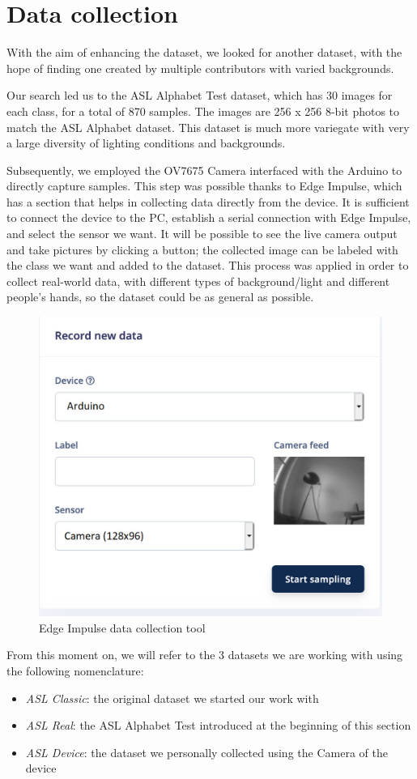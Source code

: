 \documentclass{Configuration_Files/PoliMi3i_thesis}
\begin{document}
\chapter{Data collection}
\label{ch:data-coll}%
With the aim of enhancing the dataset, we looked for another dataset, with the hope of finding one created by multiple contributors with varied backgrounds.

Our search led us to the ASL Alphabet Test \cite{asl_test} dataset, which has 30 images for each class, for a total of 870 samples. The images are 256 x 256 8-bit photos to match the ASL Alphabet dataset. This dataset is much more variegate with very a large diversity of lighting conditions and backgrounds. 

Subsequently, we employed the OV7675 Camera interfaced with the Arduino to directly capture samples.
This step was possible thanks to Edge Impulse, which has a section that helps in collecting data directly from the device. It is sufficient to connect the device to the PC, establish a serial connection with Edge Impulse, and select the sensor we want. It will be possible to see the live camera output and take pictures by clicking a button; the collected image can be labeled with the class we want and added to the dataset.
This process was applied in order to collect real-world data, with different types of background/light and different people's hands, so the dataset could be as general as possible.

\begin{figure}[H]
    \centering
    \includegraphics[width=0.5\linewidth]{camera-feeed.jpg}
    \caption{Edge Impulse data collection tool}
    \label{fig:data-collection}
\end{figure}

From this moment on, we will refer to the 3 datasets we are working with using the following nomenclature:
\begin{itemize}
    \item \textit{ASL Classic}: the original dataset we started our work with
    \item \textit{ASL Real}: the ASL Alphabet Test introduced at the beginning of this section
    \item \textit{ASL Device}: the dataset we personally collected using the Camera of the device
\end{itemize}
\end{document}

